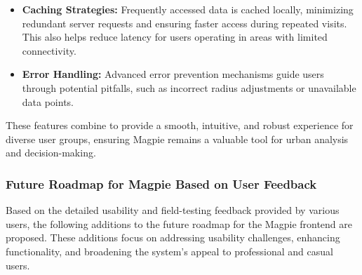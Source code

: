 \begin{enumerate}
\begin{enumerate}
\begin{itemize}
            \item \textbf{Caching Strategies:} Frequently accessed data is cached locally, minimizing redundant server requests and ensuring faster access during repeated visits. This also helps reduce latency for users operating in areas with limited connectivity.
            \item \textbf{Error Handling:} Advanced error prevention mechanisms guide users through potential pitfalls, such as incorrect radius adjustments or unavailable data points.
        \end{itemize}
        These features combine to provide a smooth, intuitive, and robust experience for diverse user groups, ensuring Magpie remains a valuable tool for urban analysis and decision-making.
    \end{enumerate}

\end{enumerate}

\subsubsection{Future Roadmap for Magpie Based on User Feedback}
Based on the detailed usability and field-testing feedback provided by various users, the following additions to the future roadmap for the Magpie frontend are proposed. These additions focus on addressing usability challenges, enhancing functionality, and broadening the system’s appeal to professional and casual users.

